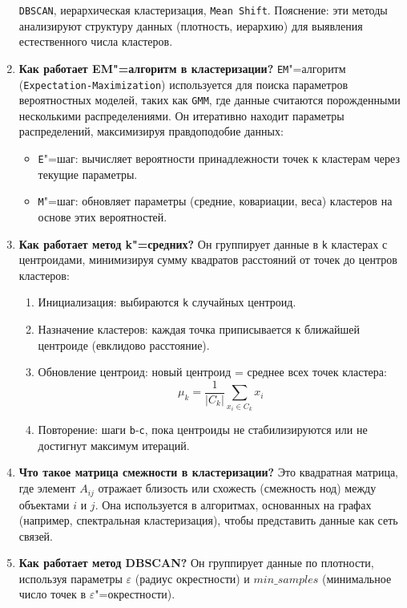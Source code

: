 \documentclass{article}
\begin{document}
\begin{enumerate}
        \texttt{DBSCAN}, иерархическая кластеризация, \texttt{Mean Shift}. Пояснение: эти методы анализируют структуру данных (плотность, иерархию) для выявления естественного числа кластеров.
    \item \textbf{Как работает EM"=алгоритм в кластеризации?}
        \texttt{EM}"=алгоритм \\ (\texttt{Expectation-Maximization}) используется для поиска параметров вероятностных моделей, таких как \texttt{GMM}, где данные считаются порожденными несколькими распределениями. Он итеративно находит параметры распределений, максимизируя правдоподобие данных:
        \begin{itemize}
            \item \texttt{E}"=шаг: вычисляет вероятности принадлежности точек к кластерам через текущие параметры.
            \item \texttt{M}"=шаг: обновляет параметры (средние, ковариации, веса) кластеров на основе этих вероятностей.
        \end{itemize}
    \item \textbf{Как работает метод k"=средних?}
        Он группирует данные в \texttt{k} кластерах с центроидами, минимизируя сумму квадратов расстояний от точек до центров кластеров:
        \begin{enumerate}
            \item Инициализация: выбираются \texttt{k} случайных центроид.
            \item Назначение кластеров: каждая точка приписывается к ближайшей центроиде (евклидово расстояние).
            \item Обновление центроид: новый центроид = среднее всех точек кластера:
            $$
                \mu_k = \frac{1}{|C_k|} \sum_{x_i \in C_k} x_i
            $$
            \item Повторение: шаги \texttt{b}-\texttt{c}, пока центроиды не стабилизируются или не достигнут максимум итераций.
        \end{enumerate}
    \item \textbf{Что такое матрица смежности в кластеризации?}
        Это квадратная матрица, где элемент $A_{ij}$ отражает близость или схожесть (смежность нод) между объектами $i$ и $j$. Она используется в алгоритмах, основанных на графах (например, спектральная кластеризация), чтобы представить данные как сеть связей.
    \item \textbf{Как работает метод DBSCAN?}
        Он группирует данные по плотности, используя параметры $\varepsilon$ (радиус окрестности) и $min\_samples$ (минимальное число точек в $\varepsilon$"=окрестности).

\end{enumerate}
\end{document}
